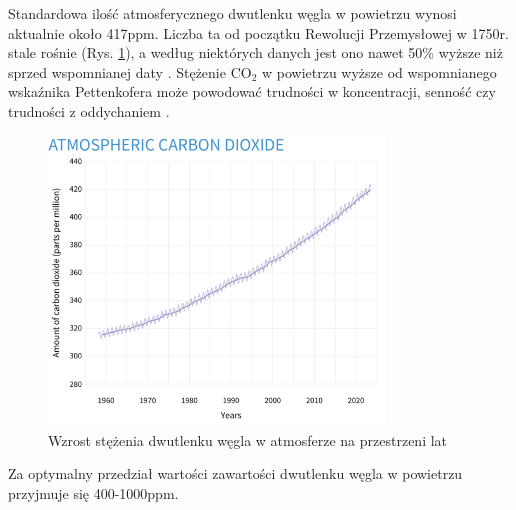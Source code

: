 Standardowa ilość atmosferycznego dwutlenku węgla w powietrzu wynosi aktualnie około 417ppm. 
Liczba ta od początku Rewolucji Przemysłowej w 1750r. stale rośnie \cite{atmo-co2-change} (Rys. \ref{co2-rising}), a według niektórych danych jest 
ono nawet 50\% wyższe niż sprzed wspomnianej daty \cite{50-percent}. Stężenie CO$_2$ w powietrzu wyższe od 
wspomnianego wskaźnika Pettenkofera może powodować trudności w koncentracji, senność czy 
trudności z oddychaniem \cite{pettenhofer}.

\begin{figure}[H]
    \centering
    \includegraphics[width=0.8\textwidth]{zdj/more-co2.png}
    \caption{Wzrost stężenia dwutlenku węgla w atmosferze na przestrzeni lat}
    \label{co2-rising}
\end{figure}

Za optymalny przedział wartości zawartości dwutlenku węgla w powietrzu przyjmuje się 400-1000ppm.